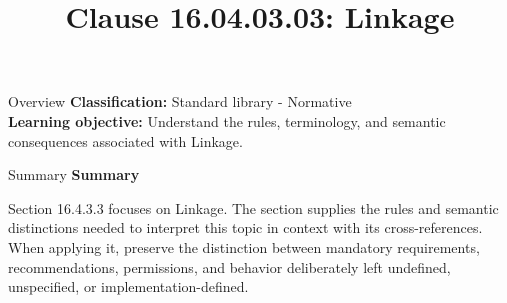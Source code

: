 \documentclass[10pt,letterpaper]{article}
\title{Clause 16.04.03.03: Linkage}
\author{}
\date{}
\begin{document}
\maketitle
\begin{CornellOverviewBox}{Overview}
\textbf{Classification:} Standard library - Normative\\[2pt]
\textbf{Learning objective:} Understand the rules, terminology, and semantic consequences associated with Linkage.
\end{CornellOverviewBox}\begin{CornellSummaryBox}{Summary}
{\sffamily\bfseries\color{Accent} Summary}\par\vspace{3pt}Section 16.4.3.3 focuses on Linkage. The section supplies the rules and semantic distinctions needed to interpret this topic in context with its cross-references. When applying it, preserve the distinction between mandatory requirements, recommendations, permissions, and behavior deliberately left undefined, unspecified, or implementation-defined.
\end{CornellSummaryBox}
\end{document}
